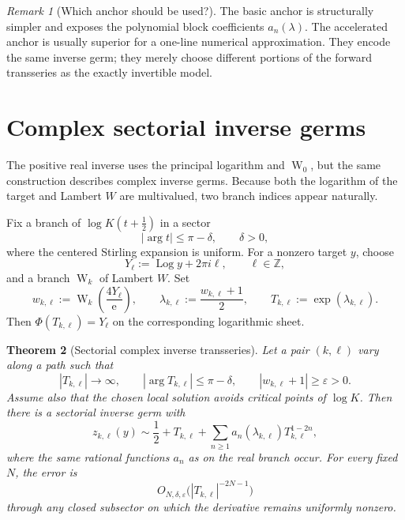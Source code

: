 \documentclass[11pt,oneside]{article}
\theoremstyle{plain}
\newtheorem{theorem}{Theorem}[section]
\theoremstyle{definition}
\theoremstyle{remark}
\newtheorem{remark}[theorem]{Remark}
\newcommand{\W}{\operatorname{W}}
\newcommand{\e}{\mathrm{e}}
\DeclareMathOperator{\Log}{Log}
\begin{document}
\begin{remark}[Which anchor should be used?]
The basic anchor is structurally simpler and exposes the polynomial block
coefficients \(a_n(\lambda)\).  The accelerated anchor is usually superior
for a one-line numerical approximation.  They encode the same inverse germ;
they merely choose different portions of the forward transseries as the
exactly invertible model.
\end{remark}

\section{Complex sectorial inverse germs}
\label{sec:complex-branches}

The positive real inverse uses the principal logarithm and \(\W_0\), but the
same construction describes complex inverse germs.  Because both the
logarithm of the target and Lambert \(W\) are multivalued, two branch indices
appear naturally.

Fix a branch of \(\log K(t+\tfrac12)\) in a sector
\begin{equation}
 |\arg t|\le \pi-\delta,
 \qquad \delta>0,
 \label{eq:t-sector}
\end{equation}
where the centered Stirling expansion is uniform.  For a nonzero target
\(y\), choose
\begin{equation}
 Y_\ell:=\Log y+2\pi i\ell,
 \qquad \ell\in\mathbb Z,
 \label{eq:Yell}
\end{equation}
and a branch \(\W_k\) of Lambert \(W\).  Set
\begin{equation}
 w_{k,\ell}:=\W_k\!\left(\frac{4Y_\ell}{\e}\right),
 \qquad
 \lambda_{k,\ell}:=\frac{w_{k,\ell}+1}{2},
 \qquad
 T_{k,\ell}:=\exp(\lambda_{k,\ell}).
 \label{eq:complex-anchor}
\end{equation}
Then \(\Phi(T_{k,\ell})=Y_\ell\) on the corresponding logarithmic sheet.

\begin{theorem}[Sectorial complex inverse transseries]
\label{thm:complex-inverse}
Let a pair \((k,\ell)\) vary along a path such that
\begin{equation}
 |T_{k,\ell}|\longrightarrow\infty,
 \qquad
 |\arg T_{k,\ell}|\le\pi-\delta,
 \qquad
 |w_{k,\ell}+1|\ge\varepsilon>0.
 \label{eq:complex-nondegenerate}
\end{equation}
Assume also that the chosen local solution avoids critical points of
\(\log K\).  Then there is a sectorial inverse germ with
\begin{equation}
 z_{k,\ell}(y)
 \sim \frac12+T_{k,\ell}
 +\sum_{n\ge1}a_n(\lambda_{k,\ell})
 T_{k,\ell}^{1-2n},
 \label{eq:complex-inverse-series}
\end{equation}
where the same rational functions \(a_n\) as on the real branch occur.  For
every fixed \(N\), the error is
\begin{equation}
 O_{N,\delta,\varepsilon}
 \bigl(|T_{k,\ell}|^{-2N-1}\bigr)
 \label{eq:complex-error}
\end{equation}
through any closed subsector on which the derivative remains uniformly
nonzero.
\end{theorem}
\end{document}
